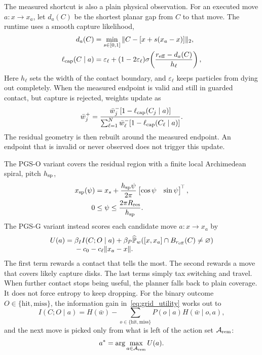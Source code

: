 \documentclass[letterpaper,10 pt,conference]{ieeeconf}
\newcommand{\pgso}{\textsc{PGS-O}}
\newcommand{\pgsg}{\textsc{PGS-G}}
\begin{document}
The measured shortcut is also a plain physical observation.  For an
executed move $a:x\rightarrow x_a$, let $d_a(C)$ be the shortest planar gap
from $C$ to that move.  The runtime uses a smooth capture likelihood,
\begin{align}
d_a(C)&=\min_{s\in[0,1]}\|C-[x+s(x_a-x)]\|_2,
\nonumber\\
\ell_{\rm cap}(C\mid a)&=\varepsilon_\ell+(1-2\varepsilon_\ell)
\sigma\!\left(\frac{r_{\rm eff}-d_a(C)}{h_\ell}\right),
\label{eq:segment_likelihood}
\end{align}
Here $h_\ell$ sets the width of the contact boundary, and
$\varepsilon_\ell$ keeps particles from dying out completely.  When the
measured endpoint is valid and still in guarded contact, but capture is
rejected, weights update as
\begin{equation}
\bar w_j^{+}=\frac{\bar w_j^{-}
[1-\ell_{\rm cap}(C_j\mid a)]}
{\sum_{\ell=1}^{N}\bar w_\ell^{-}
[1-\ell_{\rm cap}(C_\ell\mid a)]}.
\label{eq:miss_update}
\end{equation}
The residual geometry is then rebuilt around the measured endpoint.  An
endpoint that is invalid or never observed does not trigger this update.

The \pgso{} variant covers the residual region with a finite local
Archimedean spiral, pitch $h_{\rm sp}$,
\begin{equation}
\begin{aligned}
x_{\rm sp}(\psi)&=x_s+\frac{h_{\rm sp}\psi}{2\pi}
\begin{bmatrix}\cos\psi&\sin\psi\end{bmatrix}^{\!\top},\\
0&\le\psi\le\frac{2\pi R_{\rm res}}{h_{\rm sp}}.
\end{aligned}
\label{eq:residual_spiral}
\end{equation}
The \pgsg{} variant instead scores each candidate move
$a:x\rightarrow x_a$ by
\begin{align}
U(a)={}&\beta_I I(C;O\mid a)
+\beta_P\widehat{\mathbb P}_w([x,x_a]\cap B_{r_{\rm eff}}(C)\ne\varnothing)
\nonumber\\[-1mm]
&-c_0-c_\ell\|x_a-x\| .
\label{eq:grid_utility}
\end{align}
The first term rewards a contact that tells the most.  The second rewards a
move that covers likely capture disks.  The last terms simply tax switching
and travel.  When further contact stops being useful, the planner falls
back to plain coverage.  It does not force entropy to keep dropping.  For
the binary outcome $O\in\{\mathrm{hit},\mathrm{miss}\}$, the information
gain in~\eqref{eq:grid_utility} works out to
\begin{equation}
I(C;O\mid a)=H(\bar w)-
\sum_{o\in\{\mathrm{hit},\mathrm{miss}\}}
P(o\mid a)H(\bar w\mid o,a),
\label{eq:expected_information_gain}
\end{equation}
and the next move is picked only from what is left of the action set
$\mathcal A_{\rm rem}$:
\begin{equation}
a^*=\arg\max_{a\in\mathcal A_{\rm rem}}U(a).
\label{eq:grid_action_selection}
\end{equation}
\end{document}
